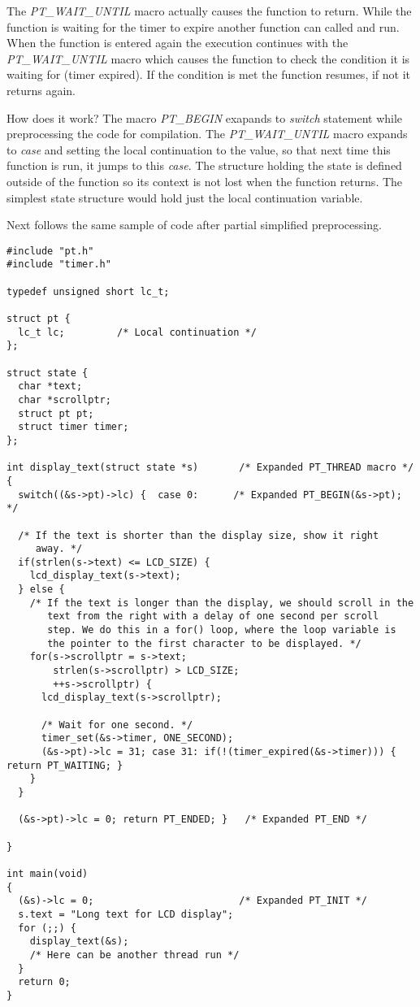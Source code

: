 The {\it PT\_WAIT\_UNTIL} macro actually causes the function
to return. While the function is waiting for the timer to expire another function can called and run.
When the function is entered again the execution continues with the {\it PT\_WAIT\_UNTIL} macro
which causes the function to check the condition it is waiting for (timer expired). If the condition is
met the function resumes, if not it returns again.

How does it work? The macro {\it PT\_BEGIN} exapands to {\it switch} statement while preprocessing the
code for compilation. The {\it PT\_WAIT\_UNTIL} macro expands to {\it case} and setting the local continuation
to the value, so that next time this function is run, it jumps to this {\it case}.
The structure holding the state is defined outside of the function so its context is not lost when
the function returns. The simplest state structure would hold just the local continuation variable.

\newpage

Next follows the same sample of code after partial simplified preprocessing.

\begin{lstlisting}
#include "pt.h"
#include "timer.h"

typedef unsigned short lc_t;

struct pt {
  lc_t lc;         /* Local continuation */
}; 

struct state {
  char *text;
  char *scrollptr;
  struct pt pt;
  struct timer timer;
};
 
int display_text(struct state *s)       /* Expanded PT_THREAD macro */
{
  switch((&s->pt)->lc) {  case 0:      /* Expanded PT_BEGIN(&s->pt); */
 
  /* If the text is shorter than the display size, show it right
     away. */
  if(strlen(s->text) <= LCD_SIZE) {
    lcd_display_text(s->text);
  } else {    
    /* If the text is longer than the display, we should scroll in the
       text from the right with a delay of one second per scroll
       step. We do this in a for() loop, where the loop variable is
       the pointer to the first character to be displayed. */
    for(s->scrollptr = s->text;
        strlen(s->scrollptr) > LCD_SIZE;
        ++s->scrollptr) {
      lcd_display_text(s->scrollptr);
 
      /* Wait for one second. */
      timer_set(&s->timer, ONE_SECOND);
      (&s->pt)->lc = 31; case 31: if(!(timer_expired(&s->timer))) { return PT_WAITING; }
    }
  }
  
  (&s->pt)->lc = 0; return PT_ENDED; }   /* Expanded PT_END */
  
}

int main(void)
{
  (&s)->lc = 0;                         /* Expanded PT_INIT */
  s.text = "Long text for LCD display";
  for (;;) {
    display_text(&s);
    /* Here can be another thread run */
  }
  return 0;
}

\end{lstlisting}



